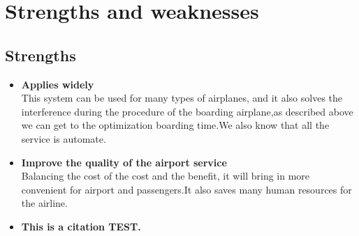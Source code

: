 \documentclass{mcmthesis}
\begin{document}
\section{Strengths and weaknesses}
\lipsum[12]

\subsection{Strengths}
\begin{itemize}
\item \textbf{Applies widely}\\
This  system can be used for many types of airplanes, and it also
solves the interference during  the procedure of the boarding
airplane,as described above we can get to the  optimization
boarding time.We also know that all the service is automate.
\item \textbf{Improve the quality of the airport service}\\
Balancing the cost of the cost and the benefit, it will bring in
more convenient  for airport and passengers.It also saves many
human resources for the airline.
\item {\large\bf{This is a citation TEST.}} \cite{knuth1984tex} \cite{lamport1986latex} \cite{latexstudio.net}
\end{itemize}



\end{document}
